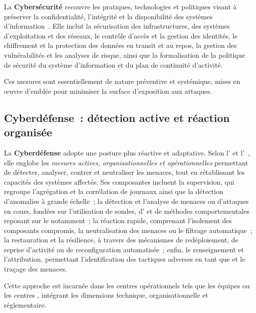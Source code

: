 La \textbf{Cybersécurité} recouvre les pratiques, technologies et politiques visant à préserver la confidentialité, l'intégrité et la disponibilité des systèmes d'information~\cite{ANSSI2024}. Elle inclut la sécurisation des infrastructures, des systèmes d'exploitation et des réseaux, le contrôle d'accès et la gestion des identités, le chiffrement et la protection des données en transit et au repos, la gestion des vulnérabilités et les analyses de risque, ainsi que la formalisation de la politique de sécurité du système d'information et du plan de continuité d'activité.

Ces mesures sont essentiellement de nature préventive et systémique, mises en œuvre d'emblée pour minimiser la surface d'exposition aux attaques.

\subsection*{Cyberdéfense~: détection active et réaction organisée}

La \textbf{Cyberdéfense} adopte une posture plus réactive et adaptative. Selon l' et l'~\cite{ANSSI2024,NATO2016Cyberdef}, elle englobe les \emph{mesures actives, organisationnelles et opérationnelles} permettant de détecter, analyser, contrer et neutraliser les menaces, tout en rétablissant les capacités des systèmes affectés. Ses composantes incluent la supervision, qui regroupe l'agrégation et la corrélation de journaux ainsi que la détection d'anomalies à grande échelle~; la détection et l'analyse de menaces ou d'attaques en cours, fondées sur l'utilisation de sondes, d' et de méthodes comportementales reposant sur le notamment~; la réaction rapide, comprenant l'isolement des composants compromis, la neutralisation des menaces ou le filtrage automatique~; la restauration et la résilience, à travers des mécanismes de redéploiement, de reprise d'activité ou de reconfiguration automatisée~; enfin, le renseignement et l'attribution, permettant l'identification des tactiques adverses en tant que  et le traçage des menaces.

Cette approche est incarnée dans les centres opérationnels tels que les équipes  ou les centres , intégrant les dimensions technique, organisationnelle et réglementaire.


